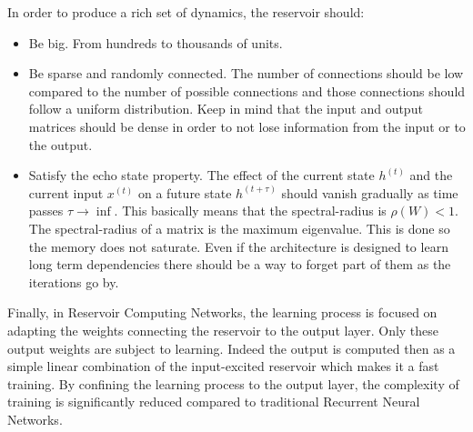 \noindent In order to produce a rich set of dynamics, the reservoir should:
\begin{itemize}
    \item Be big. From hundreds to thousands of units.
    \item Be sparse and randomly connected. The number of connections should be low compared to the number of possible connections and those connections should follow a uniform distribution. Keep in mind that the input and output matrices should be dense in order to not lose information from the input or to the output.
    \item Satisfy the echo state property. The effect of the current state $h^{(t)}$ and the current input $x^{(t)}$ on a future state $h^{(t + \tau)}$ should vanish gradually as time passes $\tau \rightarrow \inf$. This basically means that the spectral-radius is $\rho(W) < 1$. The spectral-radius of a matrix is the maximum eigenvalue. This is done so the memory does not saturate. Even if the architecture is designed to learn long term dependencies there should be a way to forget part of them as the iterations go by.
\end{itemize}

\noindent Finally, in Reservoir Computing Networks, the learning process is focused on adapting the weights connecting the reservoir to the output layer. Only these output weights are subject to learning. Indeed the output is computed then as a simple linear combination of the input-excited reservoir which makes it a fast training. By confining the learning process to the output layer, the complexity of training is significantly reduced compared to traditional Recurrent Neural Networks.















